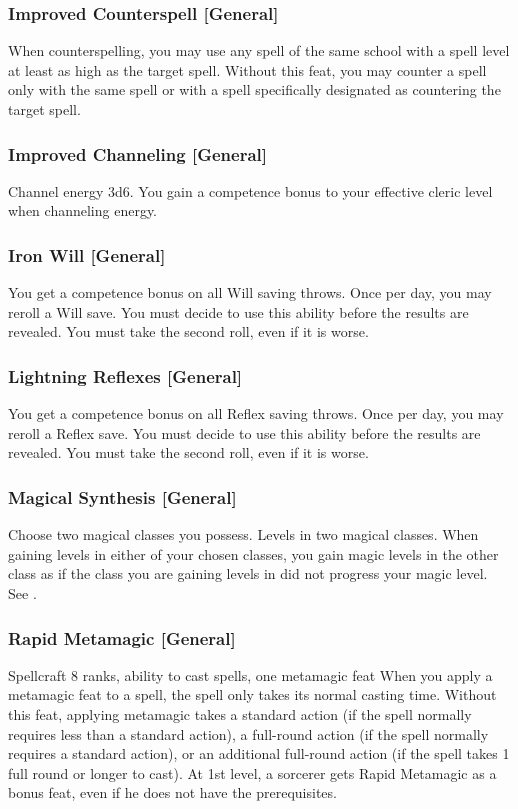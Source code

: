 \subsubsection{Improved Counterspell [General]}
 When counterspelling, you may use any spell of the same school with a spell level at least as high as the target spell.
 Without this feat, you may counter a spell only with the same spell or with a spell specifically designated as countering the target spell.

\subsubsection{Improved Channeling [General]}
 Channel energy 3d6.
 You gain a  competence bonus to your effective cleric level when channeling energy.

\subsubsection{Iron Will [General]}
 You get a  competence bonus on all Will saving throws. Once per day, you may reroll a Will save. You must decide to use this ability before the results are revealed. You must take the second roll, even if it is worse.

\subsubsection{Lightning Reflexes [General]}
 You get a  competence bonus on all Reflex saving throws. Once per day, you may reroll a Reflex save. You must decide to use this ability before the results are revealed. You must take the second roll, even if it is worse.

\subsubsection{Magical Synthesis [General]}
Choose two magical classes you possess.
 Levels in two magical classes.
 When gaining levels in either of your chosen classes, you gain magic levels in the other class as if the class you are gaining levels in did not progress your magic level. See .

\subsubsection{Rapid Metamagic [General]}
 Spellcraft 8 ranks, ability to cast spells, one metamagic feat
 When you apply a metamagic feat to a spell, the spell only takes its normal casting time.
 Without this feat, applying metamagic takes a standard action (if the spell normally requires less than a standard action), a full-round action (if the spell normally requires a standard action), or an additional full-round action (if the spell takes 1 full round or longer to cast).
 At 1st level, a sorcerer gets Rapid Metamagic as a bonus feat, even if he does not have the prerequisites.

